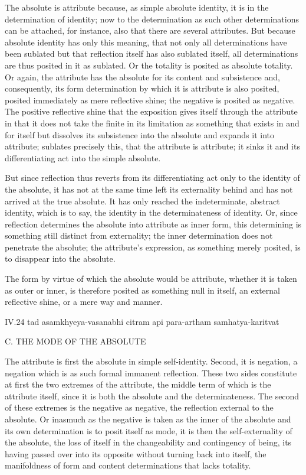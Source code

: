 The absolute is attribute because,
as simple absolute identity,
it is in the determination of identity;
now to the determination as such
other determinations can be attached,
for instance, also that there are several attributes.
But because absolute identity has only this meaning,
that not only all determinations have been sublated
but that reflection itself has also sublated itself,
all determinations are thus posited in it as sublated.
Or the totality is posited as absolute totality.
Or again, the attribute has the absolute
for its content and subsistence
and, consequently, its form determination
by which it is attribute is also posited,
posited immediately as mere reflective shine;
the negative is posited as negative.
The positive reflective shine that
the exposition gives itself through the attribute
in that it does not take the finite in its limitation as
something that exists in and for itself
but dissolves its subsistence into the absolute
and expands it into attribute;
sublates precisely this, that the attribute is attribute;
it sinks it and its differentiating act
into the simple absolute.

But since reflection thus reverts
from its differentiating act
only to the identity of the absolute,
it has not at the same time
left its externality behind
and has not arrived at the true absolute.
It has only reached the
indeterminate, abstract identity,
which is to say, the identity
in the determinateness of identity.
Or, since reflection determines the
absolute into attribute as inner form,
this determining is something
still distinct from externality;
the inner determination does not
penetrate the absolute;
the attribute's expression,
as something merely posited,
is to disappear into the absolute.

The form by virtue of which
the absolute would be attribute,
whether it is taken as outer or inner,
is therefore posited as something null in itself,
an external reflective shine,
or a mere way and manner.

IV.24
tad asamkhyeya-vasanabhi citram api para-artham samhatya-karitvat

C. THE MODE OF THE ABSOLUTE

The attribute is first
the absolute in simple self-identity.
Second, it is negation,
a negation which is as such
formal immanent reflection.
These two sides constitute at first
the two extremes of the attribute,
the middle term of which is the attribute itself,
since it is both the absolute and the determinateness.
The second of these extremes is the negative as negative,
the reflection external to the absolute.
Or inasmuch as the negative is
taken as the inner of the absolute
and its own determination is to posit itself as mode,
it is then the self-externality of the absolute,
the loss of itself in the
changeability and contingency of being,
its having passed over into its opposite
without turning back into itself,
the manifoldness of form and content
determinations that lacks totality.

